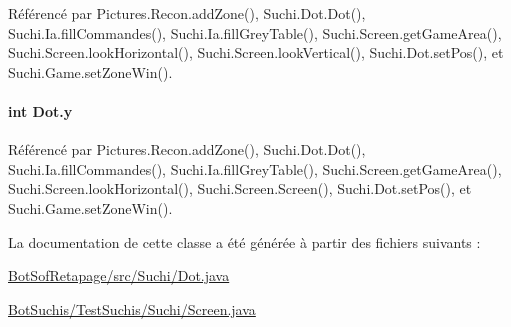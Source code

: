 Référencé par Pictures.\+Recon.\+add\+Zone(), Suchi.\+Dot.\+Dot(), Suchi.\+Ia.\+fill\+Commandes(), Suchi.\+Ia.\+fill\+Grey\+Table(), Suchi.\+Screen.\+get\+Game\+Area(), Suchi.\+Screen.\+look\+Horizontal(), Suchi.\+Screen.\+look\+Vertical(), Suchi.\+Dot.\+set\+Pos(), et Suchi.\+Game.\+set\+Zone\+Win().

\hypertarget{classSuchi_1_1Dot_aae7adce7564961a6fed16af1d2857b8b}{}
\paragraph[{y}]{\setlength{\rightskip}{0pt plus 5cm}int Dot.\+y}\label{classSuchi_1_1Dot_aae7adce7564961a6fed16af1d2857b8b}


Référencé par Pictures.\+Recon.\+add\+Zone(), Suchi.\+Dot.\+Dot(), Suchi.\+Ia.\+fill\+Commandes(), Suchi.\+Ia.\+fill\+Grey\+Table(), Suchi.\+Screen.\+get\+Game\+Area(), Suchi.\+Screen.\+look\+Horizontal(), Suchi.\+Screen.\+Screen(), Suchi.\+Dot.\+set\+Pos(), et Suchi.\+Game.\+set\+Zone\+Win().



La documentation de cette classe a été générée à partir des fichiers suivants \+:\begin{DoxyCompactItemize}
\item 
\hyperlink{BotSofRetapage_2src_2Suchi_2Dot_8java}{Bot\+Sof\+Retapage/src/\+Suchi/\+Dot.\+java}\item 
\hyperlink{BotSuchis_2TestSuchis_2Suchi_2Screen_8java}{Bot\+Suchis/\+Test\+Suchis/\+Suchi/\+Screen.\+java}\end{DoxyCompactItemize}

